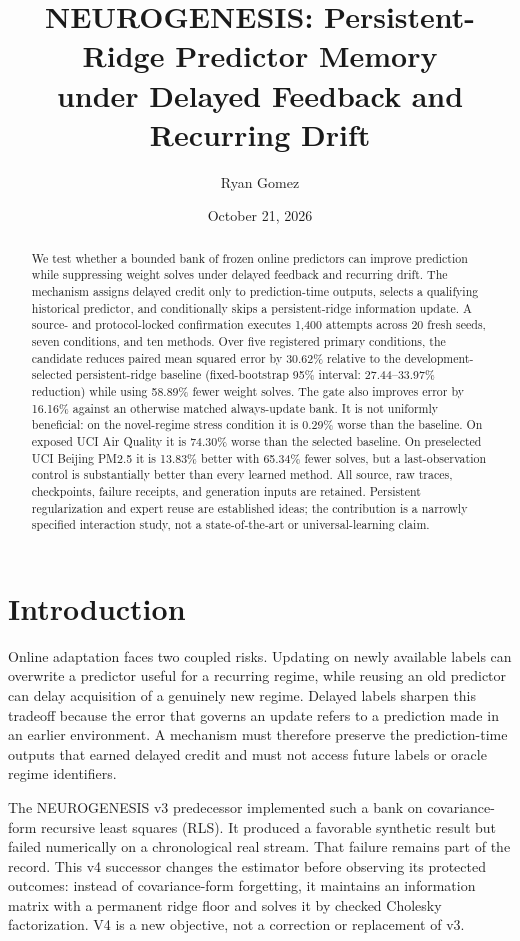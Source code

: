 \documentclass[10pt]{article}
\title{NEUROGENESIS: Persistent-Ridge Predictor Memory\\under Delayed Feedback and Recurring Drift}
\author{Ryan Gomez}
\date{October 21, 2026}
\begin{document}
\maketitle

\begin{abstract}
We test whether a bounded bank of frozen online predictors can improve prediction while suppressing weight solves under delayed feedback and recurring drift. The mechanism assigns delayed credit only to prediction-time outputs, selects a qualifying historical predictor, and conditionally skips a persistent-ridge information update. A source- and protocol-locked confirmation executes 1,400 attempts across 20 fresh seeds, seven conditions, and ten methods. Over five registered primary conditions, the candidate reduces paired mean squared error by 30.62\% relative to the development-selected persistent-ridge baseline (fixed-bootstrap 95\% interval: 27.44--33.97\% reduction) while using 58.89\% fewer weight solves. The gate also improves error by 16.16\% against an otherwise matched always-update bank. It is not uniformly beneficial: on the novel-regime stress condition it is 0.29\% worse than the baseline. On exposed UCI Air Quality it is 74.30\% worse than the selected baseline. On preselected UCI Beijing PM2.5 it is 13.83\% better with 65.34\% fewer solves, but a last-observation control is substantially better than every learned method. All source, raw traces, checkpoints, failure receipts, and generation inputs are retained. Persistent regularization and expert reuse are established ideas; the contribution is a narrowly specified interaction study, not a state-of-the-art or universal-learning claim.
\end{abstract}

\section{Introduction}
Online adaptation faces two coupled risks. Updating on newly available labels can overwrite a predictor useful for a recurring regime, while reusing an old predictor can delay acquisition of a genuinely new regime. Delayed labels sharpen this tradeoff because the error that governs an update refers to a prediction made in an earlier environment. A mechanism must therefore preserve the prediction-time outputs that earned delayed credit and must not access future labels or oracle regime identifiers.

The NEUROGENESIS v3 predecessor implemented such a bank on covariance-form recursive least squares (RLS). It produced a favorable synthetic result but failed numerically on a chronological real stream. That failure remains part of the record. This v4 successor changes the estimator before observing its protected outcomes: instead of covariance-form forgetting, it maintains an information matrix with a permanent ridge floor and solves it by checked Cholesky factorization. V4 is a new objective, not a correction or replacement of v3.
\end{document}
